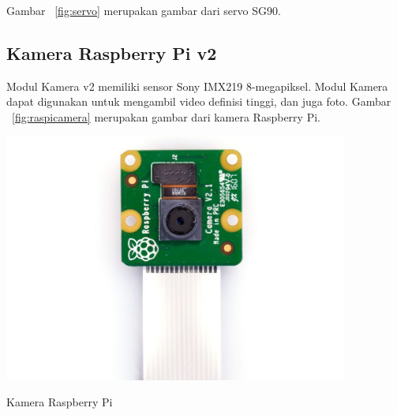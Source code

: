 Gambar ~\ref{fig:servo} merupakan gambar dari servo SG90.

\subsection{Kamera Raspberry Pi v2}
Modul Kamera v2 memiliki sensor Sony IMX219 8-megapiksel. Modul Kamera dapat digunakan untuk mengambil video definisi tinggi, dan juga foto. Gambar ~\ref{fig:raspicamera} merupakan gambar dari kamera Raspberry Pi.

\begin{afigure} 
    \includegraphics[width=0.85\textwidth, center]{images/raspicamera.jpg}
    \caption{ Kamera Raspberry Pi}
    \label{fig:raspicamera}
\end{afigure}


